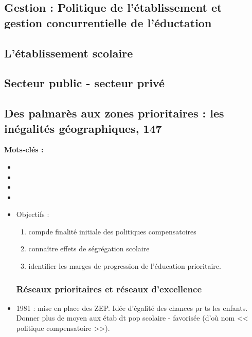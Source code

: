 \documentclass[12pt]{report}
\begin{document}
\begin{itemize}
\part{Gestion : Politique de l'établissement et gestion concurrentielle de l'éductation}

\chapter{L'établissement scolaire}

\chapter{Secteur public - secteur privé}

\chapter{Des palmarès aux zones prioritaires : les inégalités géographiques, 147}


\textbf{Mots-clés : } 

\begin{itemize}
\item 
\item 
\item 
\item  
\end{itemize}

\begin{itemize}
\item Objectifs : 
\begin{enumerate}
\item compde finalité initiale des politiques compensatoires \\
\item connaître effets de ségrégation scolaire
\item identifier les marges de progression de l'éducation prioritaire.
\end{enumerate}

\section{Réseaux prioritaires et réseaux d'excellence}


\item 1981 : mise en place des ZEP. Idée d'égalité des chances pr ts les enfants. Donner plus de moyen aux étab dt pop scolaire - favorisée (d'où nom << politique compensatoire >>).


\end{itemize}
\end{itemize}
\end{document}
